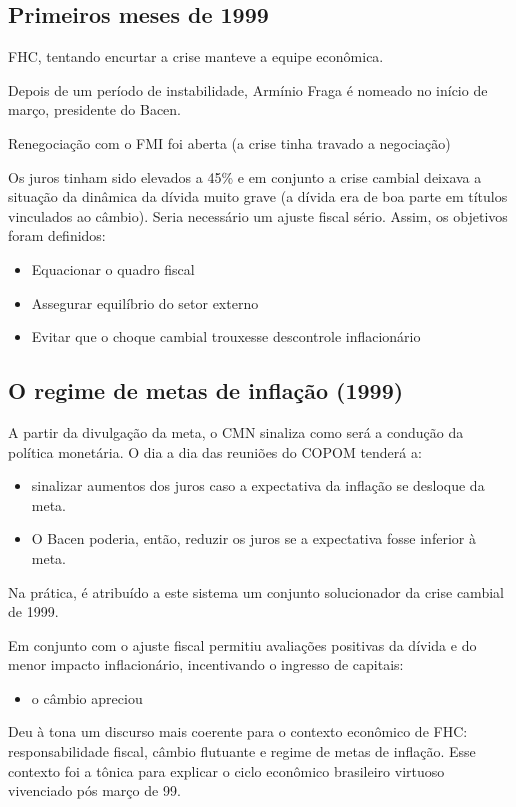 \documentclass[a4paper,12pt]{article}[abntex2]
\begin{document}
\subsection{\textbf{Primeiros meses de 1999}}
FHC, tentando encurtar a crise manteve a equipe econômica.

Depois de um período de instabilidade, Armínio Fraga é nomeado no início de março, presidente do Bacen.

Renegociação com o FMI foi aberta (a crise tinha travado a negociação)

Os juros tinham sido elevados a 45\% e em conjunto a crise cambial deixava a situação da dinâmica da dívida muito grave (a dívida era de boa parte em títulos vinculados ao câmbio). Seria necessário um ajuste fiscal sério. Assim, os objetivos foram definidos:\begin{itemize}
    \item Equacionar o quadro fiscal
    \item Assegurar equilíbrio do setor externo
    \item Evitar que o choque cambial trouxesse descontrole inflacionário
\end{itemize}

\subsection{\textbf{O regime de metas de inflação (1999)}}

A partir da divulgação da meta, o CMN sinaliza como será a condução da política monetária. O dia a dia das reuniões do COPOM tenderá a:\begin{itemize}
    \item sinalizar aumentos dos juros caso a expectativa da inflação se desloque da meta. 
    \item O Bacen poderia, então, reduzir os juros se a expectativa fosse inferior à meta.
\end{itemize}

Na prática, é atribuído a este sistema um conjunto solucionador da crise cambial de 1999.

Em conjunto com o ajuste fiscal permitiu avaliações positivas da dívida e do menor impacto inflacionário, incentivando o ingresso de capitais:\begin{itemize}
    \item o câmbio apreciou
\end{itemize}

Deu à tona um discurso mais coerente para o contexto econômico de FHC: responsabilidade fiscal, câmbio flutuante e regime de metas de inflação. Esse contexto foi a tônica para explicar o ciclo econômico brasileiro virtuoso vivenciado pós março de 99.
\end{document}
